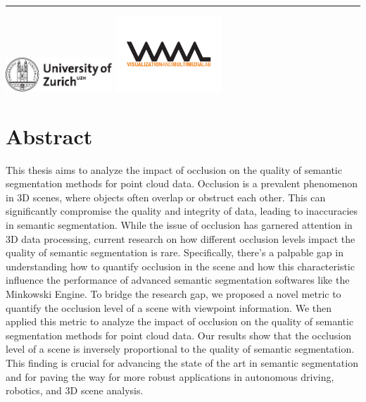 \documentclass[11pt, a4paper,oneside,chapterprefix=false]{scrbook}
\begin{document}
\begin{titlepage}
	\vfill
	\hrule
	\vspace{0.5cm}
	\includegraphics*[width=0.3\textwidth]{figures/uzh_logo} \hfill
	\includegraphics*[width=0.3\textwidth]{figures/vmml_logo}
\end{titlepage}

\chapter{Abstract} \label{chp:abstract}

This thesis aims to analyze the impact of occlusion on the quality of semantic segmentation methods for point cloud data. Occlusion is a prevalent phenomenon in 3D scenes, where objects often overlap or obstruct each other. This can significantly compromise the quality and integrity of data, leading to inaccuracies in semantic segmentation. While the issue of occlusion has garnered attention in 3D data processing, current research on how different occlusion levels impact the quality of semantic segmentation is rare. Specifically, there's a palpable gap in understanding how to quantify occlusion in the scene and how this characteristic influence the performance of advanced semantic segmentation softwares like the Minkowski Engine. To bridge the research gap, we proposed a novel metric to quantify the occlusion level of a scene with viewpoint information. We then applied this metric to analyze the impact of occlusion on the quality of semantic segmentation methods for point cloud data. Our results show that the occlusion level of a scene is inversely proportional to the quality of semantic segmentation. This finding is crucial for advancing the state of the art in semantic segmentation and for paving the way for more robust applications in autonomous driving, robotics, and 3D scene analysis.

\tableofcontents

\mainmatter
\end{document}
